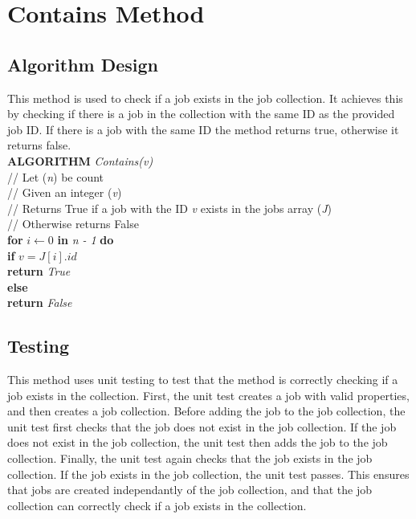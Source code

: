 \documentclass[12pt,a4paper]{article}
\begin{document}
	\newpage

	\section{Contains Method}
		\subsection{Algorithm Design}
			This method is used to check if a job exists in the job collection. It achieves this by 
			checking if there is a job in the collection with the same ID as the provided job ID. If there is 
			a job with the same ID the method returns true, otherwise it returns false.\\

			\textbf{ALGORITHM} \textit{Contains(v)}\\
			\null\hspace{1cm}// Let (\textit{n}) be count\\
			\null\hspace{1cm}// Given an integer (\textit{v})\\
			\null\hspace{1cm}// Returns True if a job with the ID \textit{v} exists in the jobs array (\textit{J})\\
			\null\hspace{1cm}// Otherwise returns False\\
			\null\hspace{1cm}\textbf{for} \textit{$i \gets 0$} \textbf{in} \textit{n - 1} \textbf{do}\\
			\null\hspace{2cm}\textbf{if} \textit{$v = J[i].id$}\\
			\null\hspace{3cm}\textbf{return} \textit{True}\\
			\null\hspace{1cm}\textbf{else}\\
			\null\hspace{2cm}\textbf{return} \textit{False}
			
		\subsection{Testing}
			This method uses unit testing to test that the method is correctly checking if a job exists in 
			the collection. First, the unit test creates a job with valid properties, and then creates 
			a job collection. Before adding the job to the job collection, the unit test 
			first checks that the job does not exist in the job collection. If the job 
			does not exist in the job collection, the unit test then adds the job to the 
			job collection. Finally, the unit test again checks that the job exists in the job 
			collection. If the job exists in the job collection, the unit test passes. This 
			ensures that jobs are created independantly of the job collection, and that the job collection 
			can correctly check if a job exists in the collection.\\
\end{document}
